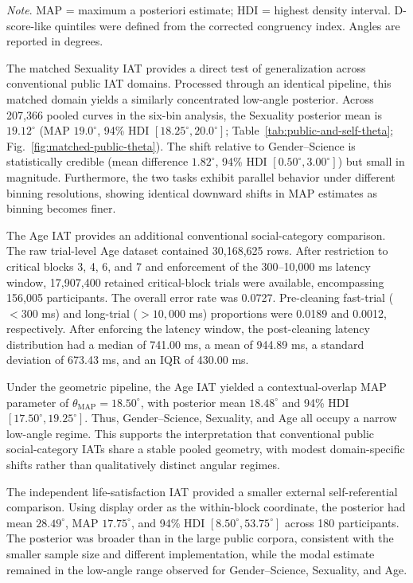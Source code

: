 \documentclass[12pt]{article}
\newcommand{\tablenote}[1]{%
\vspace{0.35em}
\begin{flushleft}
\footnotesize\emph{Note}. #1
\end{flushleft}
}
\begin{document}
\begin{table}[htbp]
\centering
\caption{Gender--Science pooled \(\theta\) by D-score-like congruency quintile.}
\label{tab:theta-dlike-quintiles}
\small

\tablenote{MAP = maximum a posteriori estimate; HDI = highest density interval. D-score-like quintiles were defined from the corrected congruency index. Angles are reported in degrees.}
\end{table}

The matched Sexuality IAT provides a direct test of generalization across conventional public IAT domains. Processed through an identical pipeline, this matched domain yields a similarly concentrated low-angle posterior. Across 207{,}366 pooled curves in the six-bin analysis, the Sexuality posterior mean is $19.12^\circ$ (MAP $19.0^\circ$, 94\% HDI $[18.25^\circ,20.0^\circ]$; Table~\ref{tab:public-and-self-theta}; Fig.~\ref{fig:matched-public-theta}). The shift relative to Gender--Science is statistically credible (mean difference $1.82^\circ$, 94\% HDI $[0.50^\circ,3.00^\circ]$) but small in magnitude. Furthermore, the two tasks exhibit parallel behavior under different binning resolutions, showing identical downward shifts in MAP estimates as binning becomes finer.

The Age IAT provides an additional conventional social-category comparison. The raw trial-level Age dataset contained 30{,}168{,}625 rows. After restriction to critical blocks 3, 4, 6, and 7 and enforcement of the 300--10{,}000 ms latency window, 17{,}907{,}400 retained critical-block trials were available, encompassing 156{,}005 participants. The overall error rate was 0.0727. Pre-cleaning fast-trial ($<300$ ms) and long-trial ($>10{,}000$ ms) proportions were 0.0189 and 0.0012, respectively. After enforcing the latency window, the post-cleaning latency distribution had a median of 741.00 ms, a mean of 944.89 ms, a standard deviation of 673.43 ms, and an IQR of 430.00 ms.

Under the geometric pipeline, the Age IAT yielded a contextual-overlap MAP parameter of $\theta_{\text{MAP}}=18.50^\circ$, with posterior mean $18.48^\circ$ and 94\% HDI $[17.50^\circ,19.25^\circ]$. Thus, Gender--Science, Sexuality, and Age all occupy a narrow low-angle regime. This supports the interpretation that conventional public social-category IATs share a stable pooled geometry, with modest domain-specific shifts rather than qualitatively distinct angular regimes.

The independent life-satisfaction IAT provided a smaller external self-referential comparison. Using display order as the within-block coordinate, the posterior had mean \(28.49^\circ\), MAP \(17.75^\circ\), and 94\% HDI \([8.50^\circ,53.75^\circ]\) across 180 participants. The posterior was broader than in the large public corpora, consistent with the smaller sample size and different implementation, while the modal estimate remained in the low-angle range observed for Gender--Science, Sexuality, and Age.
\end{document}

